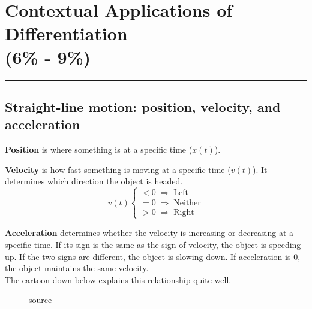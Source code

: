 \documentclass[12pt]{article}
\newcommand{\fline}{\par\noindent\rule{\textwidth}{0.1pt}} %
\begin{document}
\section[Contextual Applications of Differentiation (6\% - 9\%)]{Contextual Applications of Differentiation \\(6\% - 9\%)}
\fline

\subsection{Straight-line motion: position, velocity, and acceleration}
\noindent \textbf{Position} is where something is at a specific time ($x(t)$).

\noindent \textbf{Velocity} is how fast something is moving at a specific time ($v(t)$). It determines which direction the object is headed.
\[ v(t) \begin{cases}
		<0 \; \Rightarrow \; \text{Left}    \\
		=0 \; \Rightarrow \; \text{Neither} \\
		>0 \; \Rightarrow \; \text{Right}
	\end{cases} \]

\noindent \textbf{Acceleration} determines whether the velocity is increasing or decreasing at a specific time. If its sign is the same as the sign of velocity, the object is speeding up. If the two signs are different, the object is slowing down. If acceleration is $0$, the object maintains the same velocity.
\\ The \hyperref[fig:posveloaccel]{cartoon} down below explains this relationship quite well.

\begin{figure}[H]
	\begin{center}
		\caption{\href{https://www.khanacademy.org/science/physics/one-dimensional-motion/acceleration-tutorial/a/acceleration-article?modal=1}{source}}
		\label{fig:posveloaccel}
	\end{center}
\end{figure}
\end{document}
